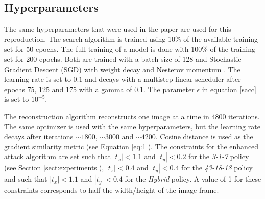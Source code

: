 \subsection{Hyperparameters}

The same hyperparameters that were used in the paper are used for this reproduction. The search algorithm is trained using 10\% of the available training set for 50 epochs. The full training of a model is done with 100\% of the training set for 200 epochs. Both are trained with a batch size of 128 and Stochastic Gradient Descent (SGD) \cite{ruder2016overview} with weight decay and Nesterov momentum \cite{sutskever2013importance}. The learning rate is set to $0.1$ and decays with a multistep linear scheduler after epochs 75, 125 and 175 with a gamma of $0.1$. The parameter $\epsilon$ in equation \ref{sacc} is set to $10^{-5}$.

The reconstruction algorithm reconstructs one image at a time in 4800 iterations. The same optimizer is used with the same hyperparameters, but the learning rate decays after iterations $\sim 1800$, $\sim 3000$ and $\sim 4200$. Cosine distance is used as the gradient similarity metric (see Equation \ref{eq:1}). The constraints for the enhanced attack algorithm are set such that $|t_x| < 1.1$ and $|t_y| < 0.2$ for the \textit{3-1-7} policy (see Section \ref{sect:experiments}), $|t_x| < 0.4$ and $|t_y| < 0.4$ for the \textit{43-18-18} policy and such that $|t_x| < 1.1$ and $|t_y| < 0.4$ for the \textit{Hybrid} policy. A value of 1 for these constraints corresponds to half the width/height of the image frame.




